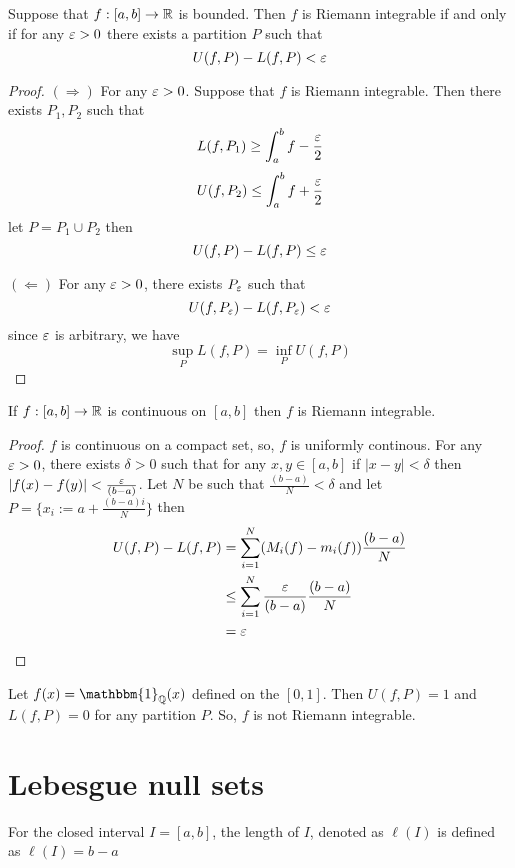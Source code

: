 \begin{lemma}
  Suppose that $f: [a, b] \to \mathbb R$ is bounded. Then $f$ is Riemann integrable if and only if for any $\varepsilon > 0$ there exists a partition $P$ such that
  \[U(f, P) - L(f, P) < \varepsilon\]
\end{lemma}

\begin{proof}
  $(\Rightarrow)$ For any $\varepsilon > 0$. Suppose that $f$ is Riemann integrable. Then there exists $P_1, P_2$ such that
  \[L(f, P_1) \ge \int_a^b f - \frac{\varepsilon}{2}\]
  \[U(f, P_2) \le \int_a^b f + \frac{\varepsilon}{2}\]
  let $P = P_1 \cup P_2$ then
  \[U(f, P) - L(f, P) \le \varepsilon\]

  $(\Leftarrow)$ For any $\varepsilon > 0$, there exists $P_\varepsilon$ such that 
  \[U(f, P_\varepsilon) - L(f, P_\varepsilon) < \varepsilon\] since $\varepsilon$ is arbitrary, we have
  \[\sup_{P}L(f, P) = \inf_{P}U(f, P)\]
\end{proof}

\begin{theorem}
  If $f: [a, b]\to\mathbb R$ is continuous on $[a, b]$ then $f$ is Riemann integrable.
\end{theorem}


\begin{proof}
  $f$ is continuous on a compact set, so, $f$ is uniformly continous. For any $\varepsilon > 0$, there exists
  $\delta > 0$ such that for any $x, y \in [a, b]$ if $|x - y| < \delta$ then $|f(x) - f(y)| < \frac{\varepsilon}{(b-a)}$.
  Let $N$ be such that $\frac{(b-a)}{N} < \delta$ and let $P = \{x_i := a + \frac{(b-a)i}{N}\}$ then
  \begin{align*}
    U(f, P) - L(f, P) &= \sum_{i=1}^{N} (M_i(f) - m_i(f))\frac{(b-a)}{N}\\
    &\le \sum_{i=1}^{N} \frac{\varepsilon}{(b-a)}\frac{(b-a)}{N}\\
    &= \varepsilon
  \end{align*}
\end{proof}

\begin{remark}
  Let $f(x) = \mathbbm{1}_{\QQ}(x)$ defined on the $[0, 1]$. 
  Then $U(f, P) = 1$ and $L(f, P) = 0$ for any partition $P$.
  So, $f$ is not Riemann integrable.
\end{remark}

\section{Lebesgue null sets}

\begin{definition}
  For the closed interval $I = [a, b]$, the length of $I$, denoted as $\ell(I)$ is defined as $\ell(I) = b - a$ 
\end{definition}

